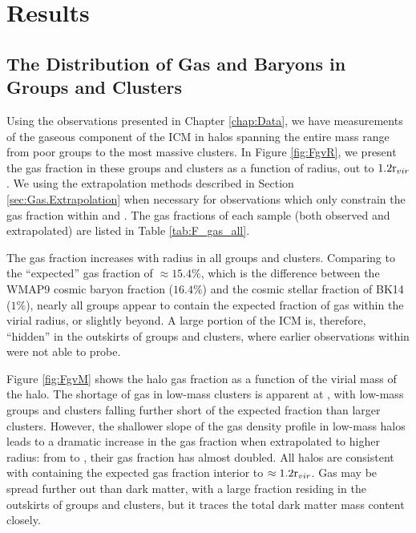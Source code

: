 \chapter{Results}
\label{chap:Results}

\section{The Distribution of Gas and Baryons in Groups and Clusters}
\label{sec:Spatial}

Using the observations presented in Chapter \ref{chap:Data}, we have
measurements of the gaseous component of the ICM in halos spanning the
entire mass range from poor groups to the most massive clusters. In
Figure \ref{fig:FgvR}, we present the gas fraction in these groups and
clusters as a function of radius, out to $1.2\textrm{r\ensuremath{_{vir}}}{}$. We using the
extrapolation methods described in Section \ref{sec:Gas.Extrapolation}
when necessary for observations which only constrain the gas fraction
within \rfive{} and \rtwo{}. The gas fractions of
each sample (both observed and extrapolated) are listed in Table
\ref{tab:F_gas_all}.

The gas fraction increases with radius in all groups and
clusters. Comparing to the ``expected'' gas fraction of $\approx
15.4\%$, which is the difference between the WMAP9 cosmic baryon
fraction ($16.4\%$) and the cosmic stellar fraction of BK14 ($1\%$),
nearly all groups appear to contain the expected fraction of gas
within the virial radius, or slightly beyond. A large portion of the
ICM is, therefore, ``hidden'' in the outskirts of groups and clusters,
where earlier observations within \rfive{} were not able to probe.



 

Figure \ref{fig:FgvM} shows the halo gas fraction as a function of the
virial mass of the halo. The shortage of gas in low-mass clusters is
apparent at \rfive{}, with low-mass groups and clusters falling
further short of the expected fraction than larger clusters. However,
the shallower slope of the gas density profile in low-mass halos leads
to a dramatic increase in the gas fraction when extrapolated to higher
radius: from \rfive{} to \rvir{}, their gas fraction has almost
doubled. All halos are consistent with containing the expected gas
fraction interior to $\approx1.2\textrm{r\ensuremath{_{vir}}}$. Gas may be spread further out
than dark matter, with a large fraction residing in the outskirts of
groups and clusters, but it traces the total dark matter mass content
closely.

